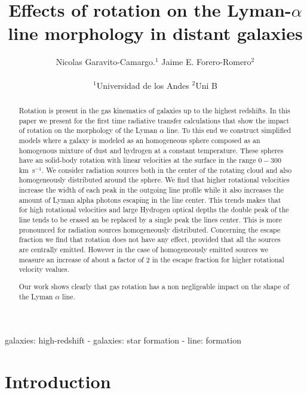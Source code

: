 \documentclass[usenatbib]{mn2e}
\newcommand{\kms}{\,km~s$^{-1}$}
\begin{document}
\title[Rotation in the Lyman-$\alpha$ line]{Effects of rotation on the
  Lyman-$\alpha$ line morphology in distant galaxies}
\author[N. Garavito and J.E. Forero-Romero]{
\parbox[t]{\textwidth}{\raggedright 
  Nicolas Garavito-Camargo.$^{1}$ 
  Jaime E. Forero-Romero$^{2}$ 
}
\vspace*{6pt}\\
$^{1}$Universidad de los Andes
$^{2}$Uni B
}
\maketitle

\begin{abstract}
Rotation is present in the gas kinematics of galaxies up to the
highest redshifts. In this paper we present for the first time
radiative transfer calculations that show the impact of rotation on
the morphology of the Lyman $\alpha$ line. To this end we construct
simplified models where a galaxy is modeled as an homogeneous sphere
composed as an homogenous mixture of dust and hydrogen at a constant
temperature. These spheres have an solid-body rotation with linear
velocities at the surface in the range $0-300$ \kms. We consider
radiation sources both in the center of the rotating cloud and also
homogeneously distributed around the sphere. We find that higher
rotational velocities increase the width of each peak in the outgoing
line profile while it also increases the amount of Lyman alpha photons
escaping in the line center. This trends makes that for high
rotational velocities and large Hydrogen optical depths the double
peak of the line tends to be erased an be replaced by a single peak the
lines center. This is more pronounced for radiation sources
homogeneously distributed. Concerning the escape fraction we find that
rotation does not have any effect, provided that all the sources are
centrally emitted. However in the case of homogeneously emitted
sources we measure an increase of about a factor of $2$ in the escape
fraction for higher rotational velocity vealues.


Our work shows clearly that gas rotation has a non
negligeable impact on the shape of the Lyman $\alpha$ line.

\end{abstract}
\begin{keywords}
galaxies: high-redshift - galaxies: star formation - line: formation
\end{keywords}


\section{Introduction}
\label{sec:intro}
\end{document}

